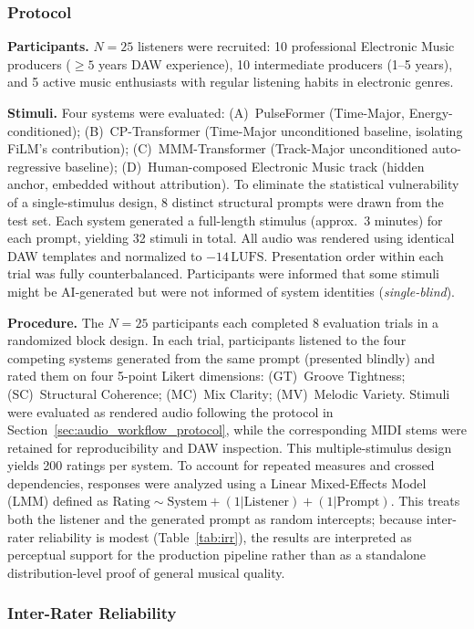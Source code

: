 \documentclass[pdflatex,sn-mathphys-num,twocolumn]{sn-jnl}
\theoremstyle{thmstyleone}
\theoremstyle{thmstyletwo}
\begin{document}
\subsubsection*{Protocol}
\textbf{Participants.} $N=25$ listeners were recruited: 10 professional Electronic Music producers ($\geq 5$ years DAW experience), 10 intermediate producers (1--5 years), and 5 active music enthusiasts with regular listening habits in electronic genres.

\textbf{Stimuli.} Four systems were evaluated:
(A)~PulseFormer (Time-Major, Energy-conditioned);
(B)~CP-Transformer (Time-Major unconditioned baseline, isolating FiLM's contribution);
(C)~MMM-Transformer (Track-Major unconditioned auto-regressive baseline);
(D)~Human-composed Electronic Music track (hidden anchor, embedded without attribution).
To eliminate the statistical vulnerability of a single-stimulus design, 8 distinct structural prompts were drawn from the test set. Each system generated a full-length stimulus (approx.\ 3 minutes) for each prompt, yielding 32 stimuli in total. All audio was rendered using identical DAW templates and normalized to $-14\,\text{LUFS}$. Presentation order within each trial was fully counterbalanced. Participants were informed that some stimuli might be AI-generated but were not informed of system identities (\textit{single-blind}).

\textbf{Procedure.} The $N=25$ participants each completed 8 evaluation trials in a randomized block design. In each trial, participants listened to the four competing systems generated from the same prompt (presented blindly) and rated them on four 5-point Likert dimensions: (GT)~Groove Tightness; (SC)~Structural Coherence; (MC)~Mix Clarity; (MV)~Melodic Variety. Stimuli were evaluated as rendered audio following the protocol in Section~\ref{sec:audio_workflow_protocol}, while the corresponding MIDI stems were retained for reproducibility and DAW inspection. This multiple-stimulus design yields 200 ratings per system. To account for repeated measures and crossed dependencies, responses were analyzed using a Linear Mixed-Effects Model (LMM) defined as $\text{Rating} \sim \text{System} + (1|\text{Listener}) + (1|\text{Prompt})$. This treats both the listener and the generated prompt as random intercepts; because inter-rater reliability is modest (Table~\ref{tab:irr}), the results are interpreted as perceptual support for the production pipeline rather than as a standalone distribution-level proof of general musical quality.

\subsubsection*{Inter-Rater Reliability}
\label{sec:irr}
\end{document}
